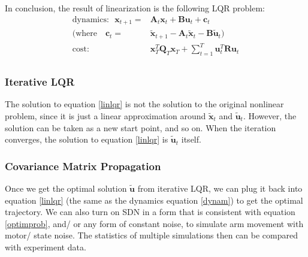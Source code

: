 In conclusion, the result of linearization is the following LQR problem:
\begin{equation}\label{linlqr}
\begin{split}
\text{dynamics:~~}\bm{x}_{t+1} =& \bm{A}_t \bm{x}_t + \bm{B}\bm{u}_t + \bm{c}_t \\
(\text{where~~~}\bm{c}_t = & \tilde{\bm{x}}_{t+1} - \bm{A}_t\tilde{\bm{x}}_{t} - \bm{B}\tilde{\bm{u}}_t) \\
\text{cost:~~~~~~~~~~~} & \bm{x}_T^T\bm{Q}_T\bm{x}_T + \sum_{t=1}^T\bm{u}_t^T\bm{Ru}_t \\
\end{split}
\end{equation}

\subsubsection{Iterative LQR}
The solution to equation \ref{linlqr} is not the solution to the original nonlinear problem, since it is just a linear approximation around $\tilde{\bm{x}}_t$ and $\tilde{\bm{u}}_t$. However, the solution can be taken as a new start point, and so on. When the iteration converges, the solution to equation \ref{linlqr} is $\tilde{\bm{u}}_t$ itself.

\subsubsection{Covariance Matrix Propagation}\label{app:covarProp}
Once we get the optimal solution $\tilde{\bm{u}}$ from iterative LQR, we can plug it back into equation \ref{linlqr} (the same as the dynamics equation \ref{dynam}) to get the optimal trajectory. We can also turn on SDN in a form that is consistent with equation \ref{optimprob}, and/ or any form of constant noise, to simulate arm movement with motor/ state noise. The statistics of multiple simulations then can be compared with experiment data.


